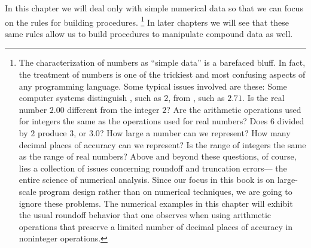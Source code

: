 In this chapter we will deal only with simple numerical data so that we can
focus on the rules for building procedures.%
\footnote{
	The characterization of numbers as “simple data” is a barefaced bluff.
	In fact, the treatment of numbers is one of the trickiest and most confusing aspects of any programming language.
	Some typical issues involved are these:
	Some computer systems distinguish , such as \( 2 \), from , such as \( 2.71 \).
	Is the real number \( 2.00 \) different from the integer \( 2 \)?
	Are the arithmetic operations used for integers the same as the operations used for real numbers?
	Does \( 6 \) divided by \( 2 \) produce \( 3 \), or \( 3.0 \)?
	How large a number can we represent?
	How many decimal places of accuracy can we represent?
	Is the range of integers the same as the range of real numbers?
	Above and beyond these questions, of course, lies a collection of issues concerning roundoff and truncation errors---%
	the entire science of numerical analysis.
	Since our focus in this book is on large-scale program design rather than on numerical techniques, we are going to ignore these problems.
	The numerical examples in this chapter will exhibit the usual roundoff behavior that one observes when using arithmetic operations that preserve a limited number of decimal places of accuracy in noninteger operations.
}
In later chapters we will see that these same rules allow us to build procedures to manipulate compound data as well.









